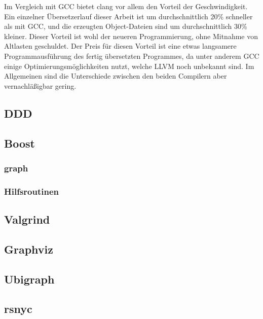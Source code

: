 Im Vergleich mit GCC bietet clang vor allem den Vorteil der Geschwindigkeit. Ein einzelner Übersetzerlauf dieser Arbeit ist um durchschnittlich 20\% schneller als mit GCC, und die erzeugten Object-Dateien
sind um durchschnittlich 30\% kleiner. Dieser Vorteil ist wohl der neueren Programmierung, ohne Mitnahme von Altlasten geschuldet. Der Preis für diesen Vorteil ist eine etwas langsamere Programmausführung
des fertig übersetzten Programmes, da unter anderem GCC einige Optimierungsmöglichkeiten nutzt, welche LLVM noch unbekannt sind. Im Allgemeinen sind die Unterschiede zwischen den beiden Compilern aber
vernachläßigbar gering.

\subsection{DDD}

\subsection{Boost}

\subsubsection{graph}

\subsubsection{Hilfsroutinen}

\subsection{Valgrind}

\subsection{Graphviz}

\subsection{Ubigraph}

\subsection{rsnyc}
